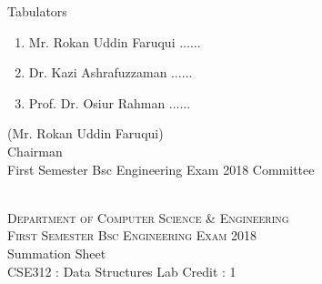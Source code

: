 \documentclass[12pt]{article}
\begin{document}
            \begin{table}[hb]
            	\centering
            \begin{minipage}[b]{0.5\linewidth} %
            {\centering Tabulators }
            \begin{enumerate}
                \item Mr. Rokan Uddin Faruqui \hspace*{1ex} $\ldots \ldots  $  
                \item Dr. Kazi Ashrafuzzaman \hspace*{1ex} $\ldots \ldots  $  
                \item Prof. Dr. Osiur Rahman \hspace*{1ex} $\ldots \ldots $  
            \end{enumerate} 

            \end{minipage}
            \hspace*{1.2cm}
            \begin{minipage}[b]{0.4\linewidth} \centering
            (Mr. Rokan Uddin Faruqui) \\
            Chairman  \hspace*{1ex} \\
           First Semester Bsc Engineering Exam 2018 Committee
            \end{minipage}
            \end{table}
            \clearpage
    \centering
    \begin{minipage}[m]{.8\textwidth} \centering 
	\smallskip
	\\
	\textsc{Department of Computer Science \& Engineering}\\
	\textsc{ First Semester Bsc Engineering Exam 2018}\\
    {\large {\sc Summation Sheet}}\\  
     {\centering CSE312 : Data Structures Lab     Credit : 1 } \\
    \end{minipage} 
\end{document}
